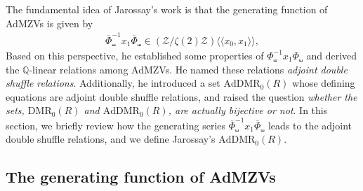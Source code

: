 \documentclass[15pt,oneside,reqno]{amsart}
\theoremstyle{remark}{
\newtheorem{lem}[df]{Lemma}
\newtheorem{prop}[df]{Proposition}
\newtheorem{ex}[df]{Example}
\newtheorem{rmk}[df]{Remark}
}
\newcommand{\Q}{\mathbb{Q}}
\newcommand{\DMR}{\mathrm{DMR}}
\newcommand{\AdDMR}{\mathrm{AdDMR}}
\begin{document}
The fundamental idea of Jarossay's work is that the generating function of AdMZVs is given by
\begin{align*}
\overline{\Phi}_{\shuffle}^{-1}x_1\overline{\Phi}_{\shuffle} \in (\mathcal{Z}/\zeta(2)\mathcal{Z})\langle \langle x_0,x_1 \rangle\rangle,
\end{align*}
Based on this perspective, he established some properties of $\Phi_{\shuffle}^{-1}x_1\Phi_{\shuffle}$ and derived the $\Q$-linear relations among AdMZVs. He named these relations \textit{adjoint double shuffle relations}.
Additionally, he introduced a set $\AdDMR_0(R)$ whose defining equations are adjoint double shuffle relations, and raised the question \textit{whether the sets, $\DMR_0(R)$ and $\AdDMR_0(R)$, are actually bijective or not}.
In this section, we briefly review how the generating series $\overline{\Phi}_{\shuffle}^{-1}x_1\overline{\Phi}_{\shuffle}$ leads to the adjoint double shuffle relations, and we define Jarossay's $\AdDMR_0(R)$.
 
\subsection{The generating function of AdMZVs}
\end{document}
